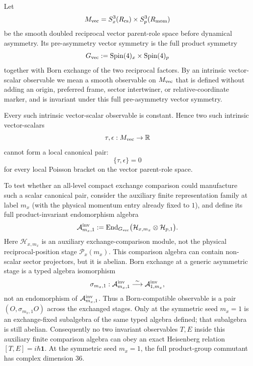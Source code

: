 \documentclass[12pt,a4paper]{article}
\begin{document}
\begin{lemma}
\label{p3:lem:no-intrinsic-vector-scalar}
Let
\[
M_{\rm vec}=S^3_x(R_{\mathrm{cs}})\times S^3_p(R_{\mathrm{mom}})
\]
be the smooth doubled reciprocal vector parent-role space before dynamical asymmetry.  Its pre-asymmetry vector
symmetry is the full product symmetry
\[
        G_{\rm vec}:=\mathrm{Spin}(4)_x\times\mathrm{Spin}(4)_p
\]
together with Born exchange of the two reciprocal factors.  By an intrinsic vector-scalar observable
we mean a smooth observable on \(M_{\rm vec}\) that is defined without adding an origin, preferred
frame, sector intertwiner, or relative-coordinate marker, and is invariant under this full
pre-asymmetry vector symmetry.

Every such intrinsic vector-scalar observable is constant.  Hence two such intrinsic vector-scalars
\[
\tau,\epsilon:M_{\rm vec}\to\mathbb R
\]
cannot form a local canonical pair:
\[
\{\tau,\epsilon\}=0
\]
for every local Poisson bracket on the vector parent-role space.

To test whether an all-level compact exchange comparison could manufacture
such a scalar canonical pair, consider the auxiliary finite representation family at label
$m_x$ (with the physical momentum entry already fixed to $1$), and define its
full product-invariant endomorphism algebra
\[
 \mathcal A^{\rm inv}_{m_x,1}
 :=\operatorname{End}_{G_{\rm vec}}
 \bigl(\mathcal H_{x,m_x}\otimes\mathcal H_{p,1}\bigr).
\]
Here \(\mathcal H_{x,m_x}\) is an auxiliary exchange-comparison module, not
the physical reciprocal-position stage \(\mathcal P_x(m_x)\).  This
comparison algebra can contain non-scalar sector projectors, but it is
abelian.
Born exchange at a generic asymmetric stage is a typed algebra isomorphism
\[
 \sigma_{m_x,1}:\mathcal A^{\rm inv}_{m_x,1}
 \stackrel{\sim}{\longrightarrow}\mathcal A^{\rm inv}_{1,m_x},
\]
not an endomorphism of \(\mathcal A^{\rm inv}_{m_x,1}\).  Thus a
Born-compatible observable is a pair
\((O,\sigma_{m_x,1}O)\) across the exchanged stages.  Only at the symmetric
seed \(m_x=1\) is an exchange-fixed subalgebra of the same typed algebra
defined; that subalgebra is still abelian.
Consequently no two invariant observables \(T,E\) inside this auxiliary
finite comparison algebra can obey an exact Heisenberg relation \([T,E]=i\hbar\mathbf1\).  At the symmetric seed $m_x=1$, the full product-group commutant has complex dimension
\(36\).
\end{lemma}
\end{document}
